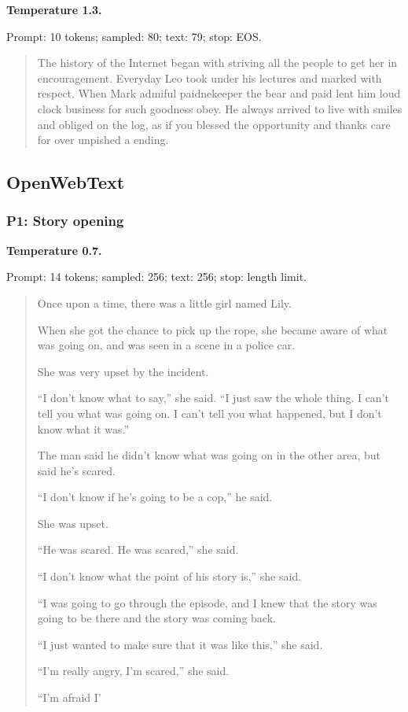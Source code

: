 
\textbf{Temperature 1.3.}

{\footnotesize Prompt: 10 tokens; sampled: 80; text: 79; stop: EOS.}

\begin{quote}\small

The history of the Internet began with striving all the people to get her in encouragement. Everyday Leo took under his lectures and marked with respect. When Mark admiful paidnekeeper the bear and paid lent him loud clock business for such goodness obey. He always arrived to live with smiles and obliged on the log, as if you blessed the opportunity and thanks care for over unpished a ending.

\end{quote}

\subsection{OpenWebText}

\subsubsection{P1: Story opening}


\textbf{Temperature 0.7.}

{\footnotesize Prompt: 14 tokens; sampled: 256; text: 256; stop: length limit.}

\begin{quote}\small

Once upon a time, there was a little girl named Lily.

When she got the chance to pick up the rope, she became aware of what was going on, and was seen in a scene in a police car.

She was very upset by the incident.

``I don't know what to say,'' she said. ``I just saw the whole thing. I can't tell you what was going on. I can't tell you what happened, but I don't know what it was.''

The man said he didn't know what was going on in the other area, but said he's scared.

``I don't know if he's going to be a cop,'' he said.

She was upset.

``He was scared. He was scared,'' she said.

``I don't know what the point of his story is,'' she said.

``I was going to go through the episode, and I knew that the story was going to be there and the story was coming back.

``I just wanted to make sure that it was like this,'' she said.

``I'm really angry, I'm scared,'' she said.

``I'm afraid I'

\end{quote}

